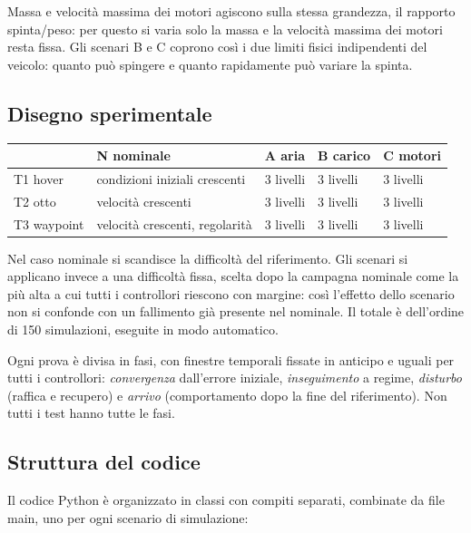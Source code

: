 \documentclass[11pt,a4paper]{article}
\begin{document}
Massa e velocità massima dei motori agiscono sulla stessa grandezza, il rapporto spinta/peso: per questo si varia solo la massa e la velocità massima dei motori resta fissa. Gli scenari B e C coprono così i due limiti fisici indipendenti del veicolo: quanto può spingere e quanto rapidamente può variare la spinta.

\subsection{Disegno sperimentale}

\begin{center}
\begin{tabular}{@{}lllll@{}}
\toprule
 & N nominale & A aria & B carico & C motori \\
\midrule
T1 hover & condizioni iniziali crescenti & 3 livelli & 3 livelli & 3 livelli \\
T2 otto & velocità crescenti & 3 livelli & 3 livelli & 3 livelli \\
T3 waypoint & velocità crescenti, regolarità & 3 livelli & 3 livelli & 3 livelli \\
\bottomrule
\end{tabular}
\end{center}

Nel caso nominale si scandisce la difficoltà del riferimento. Gli scenari si applicano invece a una difficoltà fissa, scelta dopo la campagna nominale come la più alta a cui tutti i controllori riescono con margine: così l'effetto dello scenario non si confonde con un fallimento già presente nel nominale. Il totale è dell'ordine di 150 simulazioni, eseguite in modo automatico.

Ogni prova è divisa in fasi, con finestre temporali fissate in anticipo e uguali per tutti i controllori: \emph{convergenza} dall'errore iniziale, \emph{inseguimento} a regime, \emph{disturbo} (raffica e recupero) e \emph{arrivo} (comportamento dopo la fine del riferimento). Non tutti i test hanno tutte le fasi.

\subsection{Struttura del codice}

Il codice Python è organizzato in classi con compiti separati, combinate da file main, uno per ogni scenario di simulazione:
\end{document}
